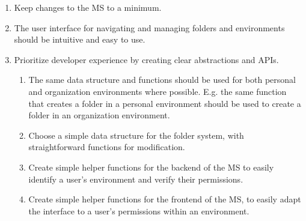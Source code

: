 \begin{enumerate}
	\item Keep changes to the MS to a minimum.


	\item The user interface for navigating and managing folders and environments should
	      be intuitive and easy to use.

	\item Prioritize developer experience by creating clear abstractions and APIs.
	      \begin{enumerate}
		      \item The same data structure and functions should be used for both personal and organization
		            environments where possible. E.g. the same function that creates a folder in a
		            personal environment should be used to create a folder in an organization environment.

		      \item Choose a simple data structure for the folder system, with straightforward
		            functions for modification.

		      \item Create simple helper functions for the backend of the MS to easily
		            identify a user's environment and verify their permissions.

		      \item Create simple helper functions for the frontend of the MS, to easily adapt
		            the interface to a user's permissions within an environment.
	      \end{enumerate}

\end{enumerate}



